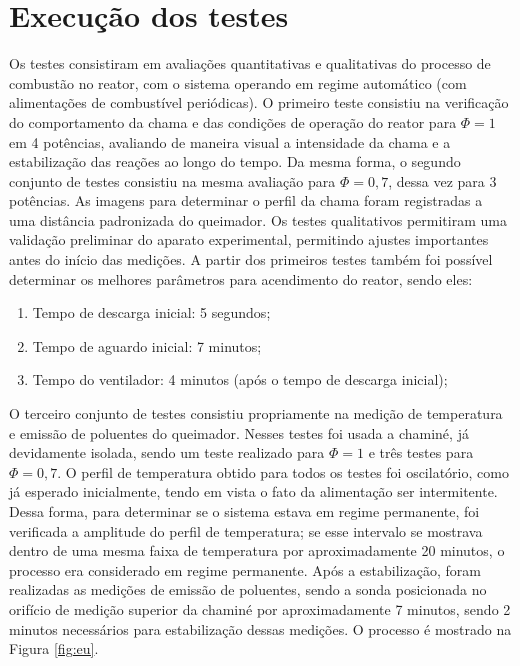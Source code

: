 \section{Execução dos testes}
Os testes consistiram em avaliações quantitativas e qualitativas do processo de combustão no reator, com o sistema operando em regime automático (com alimentações de combustível periódicas). O primeiro teste consistiu na verificação do comportamento da chama e das condições de operação do reator para $\Phi = 1$ em 4 potências, avaliando de maneira visual a intensidade da chama e a estabilização das reações ao longo do tempo. Da mesma forma, o segundo conjunto de testes consistiu na mesma avaliação para $\Phi = 0,7$, dessa vez para 3 potências. As imagens para determinar o perfil da chama foram registradas a uma distância padronizada do queimador. Os testes qualitativos permitiram uma validação preliminar do aparato experimental, permitindo ajustes importantes antes do início das medições. A partir dos primeiros testes também foi possível determinar os melhores parâmetros para acendimento do reator, sendo eles:

\begin{enumerate}[noitemsep,nosep,labelindent=\parindent,leftmargin=*,label={\alph*})] 
	\item Tempo de descarga inicial: 5 segundos;
	\item Tempo de aguardo inicial: 7 minutos;
	\item Tempo do ventilador: 4 minutos (após o tempo de descarga inicial);
\end{enumerate}

O terceiro conjunto de testes consistiu propriamente na medição de temperatura e emissão de poluentes do queimador. Nesses testes foi usada a chaminé, já devidamente isolada, sendo um teste realizado para $\Phi = 1$ e três testes para $\Phi = 0,7$. O perfil de temperatura obtido para todos os testes foi oscilatório, como já esperado inicialmente, tendo em vista o fato da alimentação ser intermitente. Dessa forma, para determinar se o sistema estava em regime permanente, foi verificada a amplitude do perfil de temperatura; se esse intervalo se mostrava dentro de uma mesma faixa de temperatura por aproximadamente 20 minutos, o processo era considerado em regime permanente. Após a estabilização, foram realizadas as medições de emissão de poluentes, sendo a sonda posicionada no orifício de medição superior da chaminé por aproximadamente 7 minutos, sendo 2 minutos necessários para estabilização dessas medições. O processo é mostrado na Figura \ref{fig:eu}.

